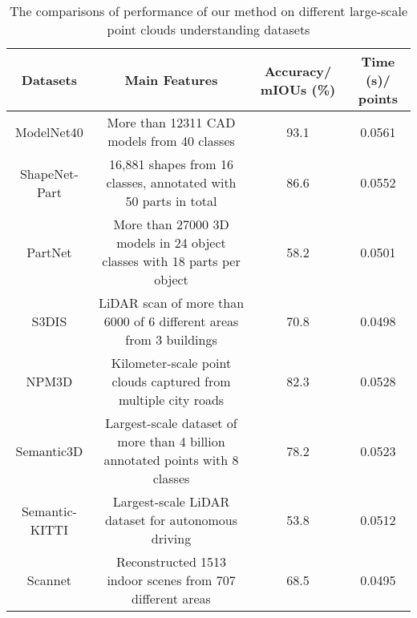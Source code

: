 \documentclass[journal]{IEEEtran}
\begin{document}
\begin{table*}[htbp!]
\caption{The comparisons of performance of our method on different large-scale point clouds understanding datasets}
\label{tab_benchmark}
\begin{center}
\begin{tabular}{cccc}
\toprule
Datasets & Main Features& Accuracy/ mIOUs (\%) & Time (s)/  points\\

\hline
ModelNet40\cite{wu20153d}& More than 12311 CAD models from 40 classes &93.1& 0.0561\\ 

ShapeNet-Part\cite{yi2016scalable}&16,881 shapes from 16 classes, annotated with 50 parts in total&86.6&0.0552\\



PartNet\cite{mo2019partnet}&More than 27000 3D models in 24 object classes with 18 parts per object &58.2&0.0501\\

S3DIS\cite{armeni20163d}&LiDAR scan of more than 6000  of 6 different areas from 3 buildings&70.8&0.0498\\

NPM3D\cite{roynard2018paris}&Kilometer-scale point clouds captured from multiple city roads&82.3&0.0528\\

Semantic3D \cite{behley2019semantickitti} & Largest-scale dataset of more than 4 billion annotated points with 8 classes&78.2&0.0523\\


Semantic-KITTI \cite{behley2019semantickitti}&Largest-scale LiDAR dataset for autonomous driving&53.8&0.0512\\

Scannet\cite{dai2017scannet}&Reconstructed 1513 indoor scenes from 707 different areas&68.5&0.0495\\

\bottomrule
\end{tabular}
\end{center}
\vspace{-3mm}
\end{table*}
\end{document}
